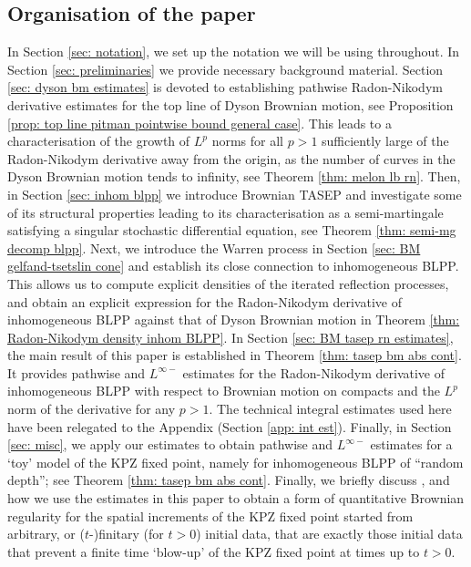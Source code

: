 \documentclass[11pt, reqno]{amsart}
\numberwithin{equation}{section}
\begin{document}
\subsection{Organisation of the paper}
In Section \ref{sec: notation}, we set up the notation we will be using throughout. In Section \ref{sec: preliminaries} we provide necessary background material. Section \ref{sec: dyson bm estimates} is devoted to establishing pathwise Radon-Nikodym derivative estimates for the top line of Dyson Brownian motion, see Proposition \ref{prop: top line pitman pointwise bound general case}. This leads to a characterisation of the growth of $L^p$ norms for all $p>1$ sufficiently large of the Radon-Nikodym derivative away from the origin, as the number of curves in the Dyson Brownian motion tends to infinity, see Theorem \ref{thm: melon lb rn}. Then, in Section \ref{sec: inhom blpp} we introduce Brownian TASEP and investigate some of its structural properties leading to its characterisation as a semi-martingale satisfying a singular stochastic differential equation, see Theorem \ref{thm: semi-mg decomp blpp}. Next, we introduce the Warren process in Section \ref{sec: BM gelfand-tsetslin cone} and establish its close connection to inhomogeneous BLPP. This allows us to compute explicit densities of the iterated reflection processes, and obtain an explicit expression for the Radon-Nikodym derivative of inhomogeneous BLPP against that of Dyson Brownian motion in Theorem \ref{thm: Radon-Nikodym  density inhom BLPP}. In Section \ref{sec: BM tasep rn estimates}, the main result of this paper is established in Theorem \ref{thm: tasep bm abs cont}. It provides pathwise and $L^{\infty-}$ estimates for the Radon-Nikodym derivative of inhomogeneous BLPP with respect to Brownian motion on compacts and the $L^p$ norm of the derivative for any $p>1$. The technical integral estimates used here have been relegated to the Appendix (Section \ref{app: int est}). Finally, in Section \ref{sec: misc}, we apply our estimates to obtain pathwise and $L^{\infty-}$ estimates for a `toy' model of the KPZ fixed point, namely for inhomogeneous BLPP of ``random depth''; see Theorem \ref{thm: tasep bm abs cont}. Finally, we briefly discuss \cite[Theorem 6.6]{tassopoulos2025quantitativebrownianregularitykpz}, and how we use the estimates in this paper to obtain a form of quantitative Brownian regularity for the spatial increments of the KPZ fixed point started from arbitrary, or ($t$-)finitary (for $t>0$) initial data, that are exactly those initial data that prevent a finite time `blow-up' of the KPZ fixed point at times up to $t>0$.
\end{document}
